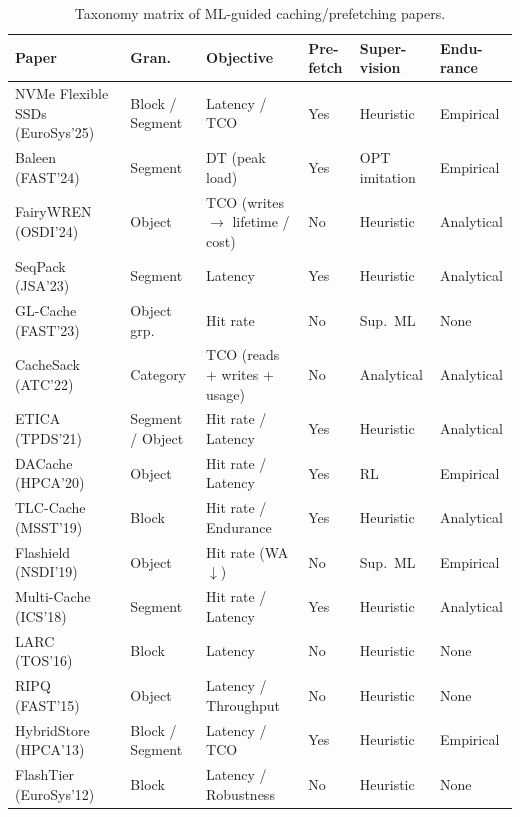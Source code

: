\begin{table}[!htbp]
\centering
\caption{Taxonomy matrix of ML-guided caching/prefetching papers.}
\label{tab:taxonomy}
\small
\setlength{\tabcolsep}{4pt}
\renewcommand{\arraystretch}{1.15}
\begin{tabular}{|p{2cm}|p{1cm}|p{1.7cm}|p{0.5cm}|p{1cm}|p{1cm}|}
\hline
\textbf{Paper} & \textbf{Gran.} & \textbf{Objective} & \textbf{Pre-fetch} & \textbf{Super-vision} & \textbf{Endu-rance} \\
\hline
NVMe Flexible SSDs (EuroSys'25)~\cite{allison2025fdp} & Block / Segment & Latency / TCO & Yes & Heuristic & Empirical \\
\hline
Baleen (FAST'24)~\cite{wong2024baleen} & Segment & DT (peak load) & Yes & OPT imitation & Empirical \\
\hline
FairyWREN (OSDI'24)~\cite{osdi24-fairywren} & Object & TCO (writes $\rightarrow$ lifetime / cost) & No & Heuristic & Analytical \\
\hline
SeqPack (JSA'23)~\cite{tang2023seqpack} & Segment & Latency & Yes & Heuristic & Analytical \\
\hline
GL-Cache (FAST'23)~\cite{yang2023glcache} & Object grp. & Hit rate & No & Sup.\ ML & None \\
\hline
CacheSack (ATC'22)~\cite{yang2022cachesack} & Category & TCO (reads + writes + usage) & No & Analytical & Analytical \\
\hline
ETICA (TPDS'21)~\cite{ahmadian2021etica} & Segment / Object & Hit rate / Latency & Yes & Heuristic & Analytical \\
\hline
DACache (HPCA'20)~\cite{li2020dacache} & Object & Hit rate / Latency & Yes & RL & Empirical \\
\hline
TLC-Cache (MSST'19)~\cite{zhong2019tlccache} & Block & Hit rate / Endurance & Yes & Heuristic & Analytical \\
\hline
Flashield (NSDI'19)~\cite{nsdi19-flashield} & Object & Hit rate (WA$\downarrow$) & No & Sup.\ ML & Empirical \\
\hline
Multi-Cache (ICS'18)~\cite{bjorling2018multicache} & Segment & Hit rate / Latency & Yes & Heuristic & Analytical \\
\hline
LARC (TOS'16)~\cite{huang2016larc} & Block & Latency & No & Heuristic & None \\
\hline
RIPQ (FAST'15)~\cite{tang2015ripq} & Object & Latency / Throughput & No & Heuristic & None \\
\hline
HybridStore (HPCA'13)~\cite{hybridstore2013} & Block / Segment & Latency / TCO & Yes & Heuristic & Empirical \\
\hline
FlashTier (EuroSys'12)~\cite{saxena2012flashtier} & Block & Latency / Robustness & No & Heuristic & None \\
\hline
\end{tabular}
\end{table}






